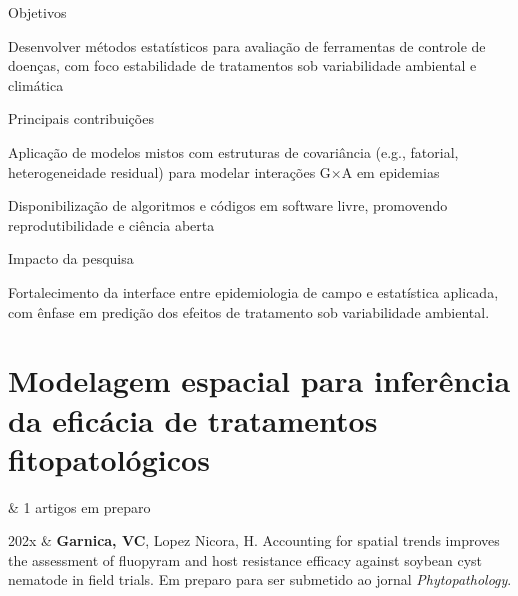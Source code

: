 \documentclass[12pt,a4paper,oneside]{book}
\newcommand{\Me}{\textbf{Garnica, VC}}
\newcommand{\Horacio}{Lopez Nicora, H}
\begin{document}
\begin{fancyenum}{\faBullseye}{Objetivos}
\item Desenvolver métodos estatísticos para avaliação de ferramentas de controle de doenças, 
  com foco estabilidade de tratamentos sob variabilidade ambiental e climática
\end{fancyenum}

\begin{fancyenum}{\faLightbulb}{Principais contribuições}
  \item Aplicação de modelos mistos com estruturas de covariância 
  (e.g., fatorial, heterogeneidade residual) para modelar interações G×A em epidemias
  \item Disponibilização de algoritmos e códigos em software livre, promovendo reprodutibilidade e ciência aberta
\end{fancyenum}

\begin{fancyenum}{\faRocket}{Impacto da pesquisa}
  \item Fortalecimento da interface entre epidemiologia de campo e estatística aplicada,
  com ênfase em predição dos efeitos de tratamento sob variabilidade ambiental.
\end{fancyenum}



\section{Modelagem espacial para inferência da eficácia de tratamentos fitopatológicos}
\label{sec_spatial}

\begin{summarybox}[frametitle=\faInfoCircle{}\quad Resumo da linha de pesquisa]
\begin{fa-ul}
\faFilePdf & 1 artigos em preparo \\
\end{fa-ul}
\end{summarybox}
\begin{subsummarybox}[frametitle=\faFilePdf{}\quad Artigos em preparo]
\begin{paperlist}
  202x & \Me, \Horacio.
  Accounting for spatial trends improves the assessment of fluopyram and host resistance 
  efficacy against soybean cyst nematode in field trials.
  Em preparo para ser submetido ao jornal \emph{Phytopathology}.
\\
\end{paperlist}
\end{subsummarybox}
\end{document}
